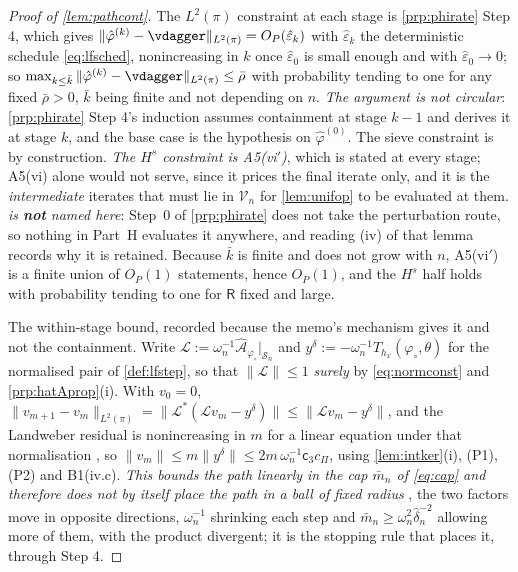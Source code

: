 \begin{proof}[Proof of \cref{lem:pathcont}]
The $L^{2}(\pi)$ constraint at each stage is \cref{prp:phirate} Step 4, which gives
$\|\hat\varphi^{(k)}-\vdagger\|_{L^{2}(\pi)}=O_P(\hat\varepsilon_k)$ with $\hat\varepsilon_k$ the
deterministic schedule \eqref{eq:lfsched}, nonincreasing in $k$ once $\hat\varepsilon_0$ is small
enough and with $\hat\varepsilon_0\to0$; so
$\max_{k\le\bar k}\|\hat\varphi^{(k)}-\vdagger\|_{L^{2}(\pi)}\le\bar\rho$
with probability tending to one for any fixed $\bar\rho>0$, $\bar k$ being finite and not depending on
$n$. \emph{The argument is not circular}: \cref{prp:phirate} Step 4's induction assumes containment at
stage $k-1$ and derives it at stage $k$, and the base case is the hypothesis on $\hat\varphi^{(0)}$.
The sieve constraint is by construction. \emph{The $H^{s}$ constraint is A5(vi$'$)}, which is stated at
every stage; A5(vi) alone would not serve, since it prices the final iterate only, and it is the
\emph{intermediate} iterates that must lie in $\mathcal V_n$ for \cref{lem:unifop} to be evaluated at
them. \emph{ is \textbf{not} named here}: Step~0 of \cref{prp:phirate} does not take the
perturbation route, so nothing in
Part~H evaluates it anywhere, and reading (iv) of that lemma records why it is retained.
Because $\bar k$ is finite and does not grow with $n$,
A5(vi$'$) is a finite union of $O_P(1)$ statements, hence $O_P(1)$, and the $H^{s}$ half holds with
probability tending to one for $\mathsf R$ fixed and large.

The within-stage bound, recorded because the memo's mechanism gives it and not the containment.
Write $\mathcal L:=\omega_n^{-1}\hat{\mathcal A}_{\varphi_\circ}\vert_{\mathcal S_n}$ and
$y^\delta:=-\omega_n^{-1}\hat T_{h_x}(\varphi_\circ,\theta)$ for the normalised pair of
\cref{def:lfstep}, so that $\|\mathcal L\|\le1$ \emph{surely} by \eqref{eq:normconst} and
\cref{prp:hatAprop}(i). With $v_0=0$,
$\|v_{m+1}-v_m\|_{L^{2}(\pi)}=\|\mathcal L^{\ast}(\mathcal Lv_m-y^\delta)\|\le\|\mathcal Lv_m-y^\delta\|$,
and the Landweber residual is nonincreasing in $m$ for a linear equation under that normalisation
\citep[Ch.~6]{engl2000}, so
$\|v_m\|\le m\|y^\delta\|\le 2m\,\omega_n^{-1}\mathsf c_3c_\Pi$, using
\cref{lem:intker}(i), (P1), (P2) and B1(iv.c). \emph{This bounds the path linearly in the cap
$\bar m_n$ of \eqref{eq:cap} and therefore does not by itself place the path in a ball of fixed radius}
, the two factors move in opposite directions, $\omega_n^{-1}$ shrinking each step and
$\bar m_n\ge\omega_n^{2}\hat\delta_n^{-2}$ allowing more of them, with the product divergent; it is
the stopping rule that places it, through Step 4.
\end{proof}

